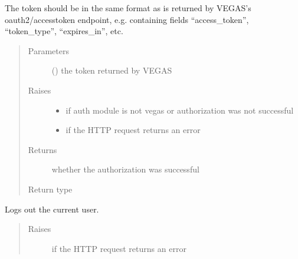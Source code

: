 \documentclass[letterpaper,10pt,english]{sphinxmanual}
\begin{document}
\begin{fulllineitems}
\begin{fulllineitems}
\sphinxAtStartPar
The token should be in the same format as is returned by VEGAS’s oauth2/accesstoken
endpoint, e.g. containing fields “access\_token”, “token\_type”, “expires\_in”, etc.
\begin{quote}\begin{description}
\item[{Parameters}] \leavevmode
\sphinxAtStartPar
{} () \textendash{} the token returned by VEGAS

\item[{Raises}] \leavevmode\begin{itemize}
\item {} 
\sphinxAtStartPar
{\hyperref[\detokenize{autoapi/pine/client/exceptions/index:pine.client.exceptions.PineClientAuthException}]{}} \textendash{} if auth module is not vegas or authorization was not successful

\item {} 
\sphinxAtStartPar
{\hyperref[\detokenize{autoapi/pine/client/exceptions/index:pine.client.exceptions.PineClientHttpException}]{}} \textendash{} if the HTTP request returns an error

\end{itemize}

\item[{Returns}] \leavevmode
\sphinxAtStartPar
whether the authorization was successful

\item[{Return type}] \leavevmode
\sphinxAtStartPar
{}

\end{description}\end{quote}

\end{fulllineitems}


\begin{fulllineitems}
\label{\detokenize{autoapi/pine/client/client/index:pine.client.client.PineClient.logout}}
\sphinxAtStartPar
Logs out the current user.
\begin{quote}\begin{description}
\item[{Raises}] \leavevmode
\sphinxAtStartPar
{\hyperref[\detokenize{autoapi/pine/client/exceptions/index:pine.client.exceptions.PineClientHttpException}]{}} \textendash{} if the HTTP request returns an error


\end{description}
\end{quote}
\end{fulllineitems}
\end{fulllineitems}
\end{document}
